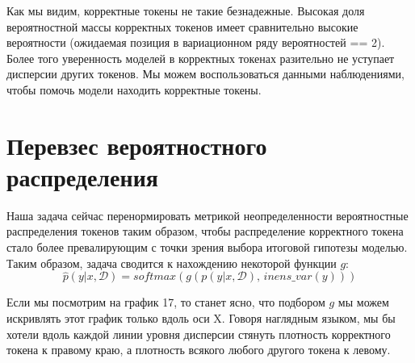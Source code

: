 \documentclass[a4paper,14pt]{extarticle}
\begin{document}
	\begin{figure}[t]
	\end{figure}
	
	Как мы видим, корректные токены не такие безнадежные. Высокая доля вероятностной массы корректных токенов имеет сравнительно высокие вероятности (ожидаемая позиция в вариационном ряду вероятностей == 2). Более того уверенность моделей в корректных токенах разительно не уступает дисперсии других токенов. Мы можем воспользоваться данными наблюдениями, чтобы помочь модели находить корректные токены.
	
\section{Перевзес вероятностного распределения}
	Наша задача сейчас перенормировать метрикой неопределенности вероятностные распределения токенов таким образом, чтобы распределение корректного токена стало более превалирующим с точки зрения выбора итоговой гипотезы моделью. Таким образом, задача сводится к нахождению некоторой функции $g$:
	\begin{equation*}
		\hat{p}(y | x, \mathcal{D}) = softmax(g(p(y | x, \mathcal{D}),\, inens\_var(y)))
	\end{equation*}
	
	Если мы посмотрим на график 17, то станет ясно, что подбором $g$ мы можем искривлять этот график только вдоль оси X. Говоря наглядным языком, мы бы хотели вдоль каждой линии уровня дисперсии стянуть плотность корректного токена к правому краю, а плотность всякого любого другого токена к левому.
	
\end{document}
